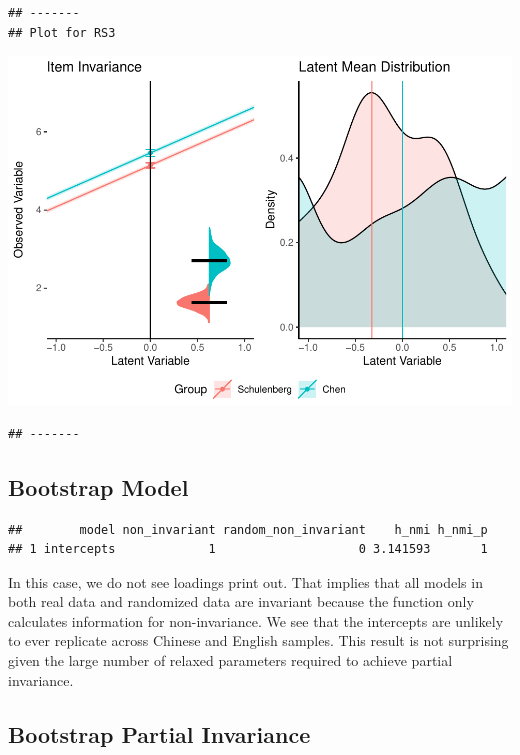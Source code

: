 \documentclass[
  man]{apa7}
\begin{document}
\begin{verbatim}
## -------
## Plot for RS3
\end{verbatim}

\includegraphics{manuscript_files/figure-latex/unnamed-chunk-107-8.pdf}

\begin{verbatim}
## -------
\end{verbatim}

\hypertarget{bootstrap-model}{%
\subsection{Bootstrap Model}\label{bootstrap-model}}

\begin{verbatim}
##        model non_invariant random_non_invariant    h_nmi h_nmi_p
## 1 intercepts             1                    0 3.141593       1
\end{verbatim}

In this case, we do not see loadings print out. That implies that all models in both real data and randomized data are invariant because the function only calculates information for non-invariance. We see that the intercepts are unlikely to ever replicate across Chinese and English samples. This result is not surprising given the large number of relaxed parameters required to achieve partial invariance.

\hypertarget{bootstrap-partial-invariance}{%
\subsection{Bootstrap Partial Invariance}\label{bootstrap-partial-invariance}}
\end{document}
